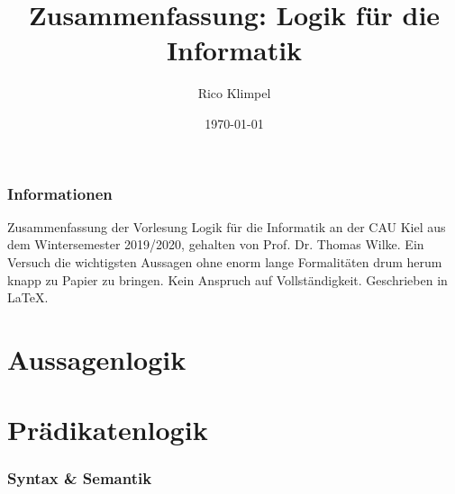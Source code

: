 \documentclass[twocolumn]{article}
\title{Zusammenfassung: Logik für die Informatik }
\author{Rico Klimpel}
\date{\today}
\begin{document}
    \maketitle   
    \tableofcontents

    \setcounter{page}{1}

    \section*{Informationen}
    Zusammenfassung der Vorlesung Logik für die Informatik an der CAU Kiel aus dem Wintersemester 2019/2020, gehalten von Prof. Dr. Thomas Wilke. Ein Versuch die wichtigsten Aussagen ohne enorm lange Formalitäten drum herum knapp zu Papier zu bringen. Kein Anspruch auf Vollständigkeit. Geschrieben in \LaTeX.

    \clearpage

    \part{Aussagenlogik}
    

    \clearpage
    \part{Prädikatenlogik}

    \section{Syntax \& Semantik}
\end{document}
